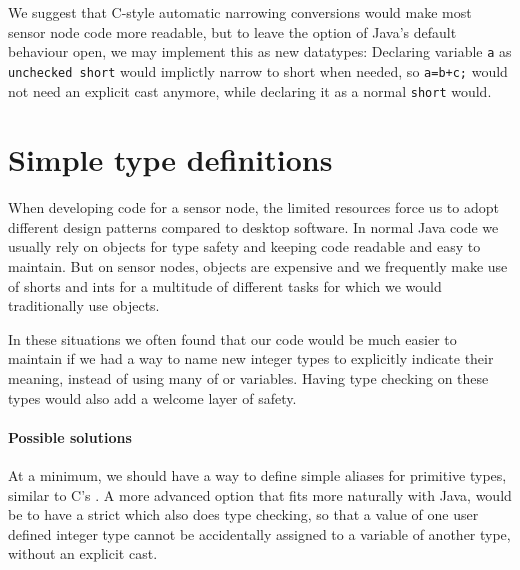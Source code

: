 We suggest that C-style automatic narrowing conversions would make most sensor node code more readable, but to leave the option of Java's default behaviour open, we may implement this as new datatypes: Declaring variable \texttt{a} as \texttt{unchecked short} would implictly narrow to short when needed, so \texttt{a=b+c;} would not need an explicit cast anymore, while declaring it as a normal \texttt{short} would.







\section{Simple type definitions}
\label{sec-typedef}
When developing code for a sensor node, the limited resources force us to adopt different design patterns compared to desktop software. In normal Java code we usually rely on objects for type safety and keeping code readable and easy to maintain. But on sensor nodes, objects are expensive and we frequently make use of shorts and ints for a multitude of different tasks for which we would traditionally use objects.

In these situations we often found that our code would be much easier to maintain if we had a way to name new integer types to explicitly indicate their meaning, instead of using many of  or  variables. Having type checking on these types would also add a welcome layer of safety.

\paragraph{Possible solutions}
At a minimum, we should have a way to define simple aliases for primitive types, similar to C's . A more advanced option that fits more naturally with Java, would be to have a strict  which also does type checking, so that a value of one user defined integer type cannot be accidentally assigned to a variable of another type, without an explicit cast.




